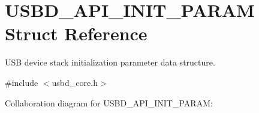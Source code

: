 \hypertarget{structUSBD__API__INIT__PARAM}{}\section{U\+S\+B\+D\+\_\+\+A\+P\+I\+\_\+\+I\+N\+I\+T\+\_\+\+P\+A\+R\+AM Struct Reference}
\label{structUSBD__API__INIT__PARAM}


U\+SB device stack initialization parameter data structure.  




{\ttfamily \#include $<$usbd\+\_\+core.\+h$>$}



Collaboration diagram for U\+S\+B\+D\+\_\+\+A\+P\+I\+\_\+\+I\+N\+I\+T\+\_\+\+P\+A\+R\+AM\+:
